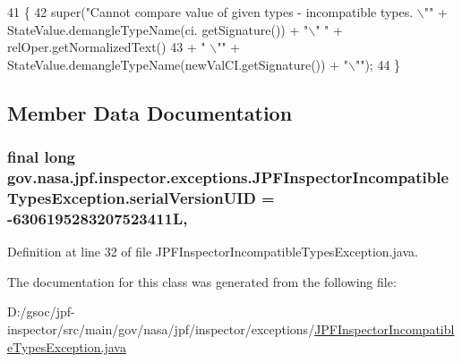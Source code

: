 \begin{DoxyCode}
41                                                                                                            
        \{
42     super(\textcolor{stringliteral}{"Cannot compare value of given types - incompatible types. \(\backslash\)""} + StateValue.demangleTypeName(ci.
      getSignature()) + \textcolor{stringliteral}{"\(\backslash\)" "} + relOper.getNormalizedText()
43         + \textcolor{stringliteral}{" \(\backslash\)""} + StateValue.demangleTypeName(newValCI.getSignature()) + \textcolor{stringliteral}{"\(\backslash\)""});
44   \}
\end{DoxyCode}


\subsection{Member Data Documentation}
\subsubsection[{\texorpdfstring{serial\+Version\+U\+ID}{serialVersionUID}}]{\setlength{\rightskip}{0pt plus 5cm}final long gov.\+nasa.\+jpf.\+inspector.\+exceptions.\+J\+P\+F\+Inspector\+Incompatible\+Types\+Exception.\+serial\+Version\+U\+ID = -\/6306195283207523411L\hspace{0.3cm}{\ttfamily [static]}, {\ttfamily [private]}}\hypertarget{classgov_1_1nasa_1_1jpf_1_1inspector_1_1exceptions_1_1_j_p_f_inspector_incompatible_types_exception_aeef4b3bd4659af045c1160244ca9f21c}{}\label{classgov_1_1nasa_1_1jpf_1_1inspector_1_1exceptions_1_1_j_p_f_inspector_incompatible_types_exception_aeef4b3bd4659af045c1160244ca9f21c}


Definition at line 32 of file J\+P\+F\+Inspector\+Incompatible\+Types\+Exception.\+java.



The documentation for this class was generated from the following file\+:\begin{DoxyCompactItemize}
\item 
D\+:/gsoc/jpf-\/inspector/src/main/gov/nasa/jpf/inspector/exceptions/\hyperlink{_j_p_f_inspector_incompatible_types_exception_8java}{J\+P\+F\+Inspector\+Incompatible\+Types\+Exception.\+java}\end{DoxyCompactItemize}
